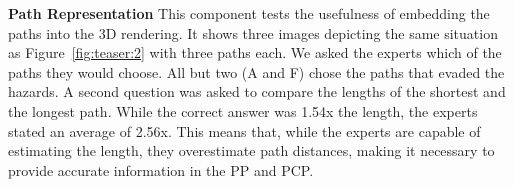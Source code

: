 \documentclass{egpubl}
\begin{document}


\noindent \textbf{Path Representation} This component tests the usefulness of embedding the paths into the 3D rendering. It shows three images depicting the same situation as Figure~\ref{fig:teaser:2} with three paths each. We asked the experts which of the paths they would choose. All but two (A and F) chose the paths that evaded the hazards. A second question was asked to compare the lengths of the shortest and the longest path. While the correct answer was 1.54x the length, the experts stated an average of 2.56x. This means that, while the experts are capable of estimating the length, they overestimate path distances, making it necessary to provide accurate information in the PP and PCP.
\end{document}
